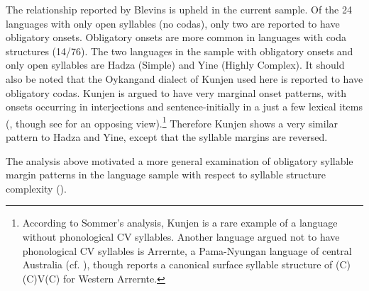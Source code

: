   The relationship reported by Blevins is upheld in the current sample. Of the 24 languages with only open syllables (no codas), only two are reported to have obligatory onsets. Obligatory onsets are more common in languages with coda structures (14/76). The two languages in the sample with obligatory onsets and only open syllables are Hadza (Simple) and Yine (Highly Complex). It should also be noted that the Oykangand dialect of Kunjen used here is reported to have obligatory codas. Kunjen is argued to have very marginal onset patterns, with onsets occurring in interjections and sentence-initially in a just a few lexical items (\citealt{Sommer1969,Sommer1970,Sommer1981}, though see \citealt{Dixon1970} for an opposing view).\footnote{{According to Sommer’s analysis, Kunjen is a rare example of a language without phonological CV syllables. Another language argued not to have phonological CV syllables is Arrernte, a Pama-Nyungan language of central Australia (cf. \citealt{BreenPensalfini1999}), though \citet{Anderson2000} reports a canonical surface syllable structure of (C)(C)V(C) for Western Arrernte.}} Therefore Kunjen shows a very similar pattern to Hadza and Yine, except that the syllable margins are reversed.

  The analysis above motivated a more general examination of obligatory syllable margin patterns in the language sample with respect to syllable structure complexity ().

